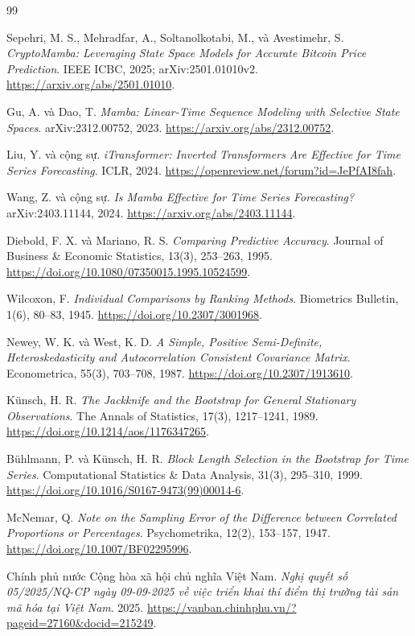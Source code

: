 \documentclass[13pt,a4paper,oneside]{report}
\begin{document}
\begin{thebibliography}{99}

Sepehri, M. S., Mehradfar, A., Soltanolkotabi, M., và Avestimehr, S.
\textit{CryptoMamba: Leveraging State Space Models for Accurate Bitcoin Price Prediction}.
IEEE ICBC, 2025; arXiv:2501.01010v2. \url{https://arxiv.org/abs/2501.01010}.

Gu, A. và Dao, T. \textit{Mamba: Linear-Time Sequence Modeling with Selective State Spaces}.
arXiv:2312.00752, 2023. \url{https://arxiv.org/abs/2312.00752}.

Liu, Y. và cộng sự. \textit{iTransformer: Inverted Transformers Are Effective for Time Series
Forecasting}. ICLR, 2024. \url{https://openreview.net/forum?id=JePfAI8fah}.

Wang, Z. và cộng sự. \textit{Is Mamba Effective for Time Series Forecasting?}
arXiv:2403.11144, 2024. \url{https://arxiv.org/abs/2403.11144}.

Diebold, F. X. và Mariano, R. S. \textit{Comparing Predictive Accuracy}.
Journal of Business \& Economic Statistics, 13(3), 253--263, 1995.
\url{https://doi.org/10.1080/07350015.1995.10524599}.

Wilcoxon, F. \textit{Individual Comparisons by Ranking Methods}.
Biometrics Bulletin, 1(6), 80--83, 1945. \url{https://doi.org/10.2307/3001968}.

Newey, W. K. và West, K. D. \textit{A Simple, Positive Semi-Definite, Heteroskedasticity and
Autocorrelation Consistent Covariance Matrix}. Econometrica, 55(3), 703--708, 1987.
\url{https://doi.org/10.2307/1913610}.

Künsch, H. R. \textit{The Jackknife and the Bootstrap for General Stationary Observations}.
The Annals of Statistics, 17(3), 1217--1241, 1989.
\url{https://doi.org/10.1214/aos/1176347265}.

Bühlmann, P. và Künsch, H. R. \textit{Block Length Selection in the Bootstrap for Time Series}.
Computational Statistics \& Data Analysis, 31(3), 295--310, 1999.
\url{https://doi.org/10.1016/S0167-9473(99)00014-6}.

McNemar, Q. \textit{Note on the Sampling Error of the Difference between Correlated Proportions or
Percentages}. Psychometrika, 12(2), 153--157, 1947.
\url{https://doi.org/10.1007/BF02295996}.

Chính phủ nước Cộng hòa xã hội chủ nghĩa Việt Nam. \textit{Nghị quyết số 05/2025/NQ-CP ngày
09-09-2025 về việc triển khai thí điểm thị trường tài sản mã hóa tại Việt Nam}. 2025.
\url{https://vanban.chinhphu.vn/?pageid=27160&docid=215249}.
\end{thebibliography}
\end{document}
